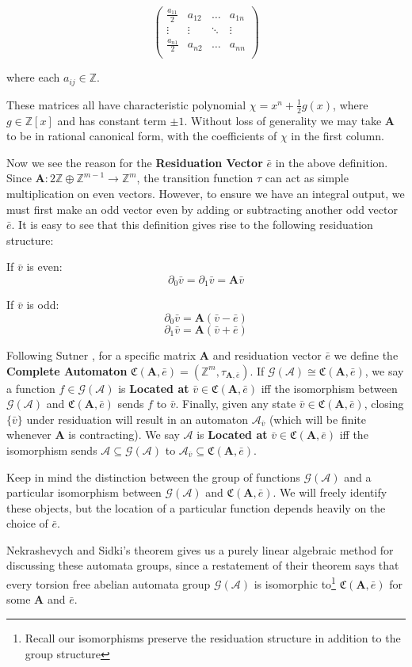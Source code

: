 \documentclass[final]{ws-ijac}
\newcommand{\A}{\mathcal{A}}
\newcommand{\G}{\mathcal{G}}
\newcommand{\C}{\mathfrak{C}(\Am,\e)}
\newcommand{\Z}{\mathbb{Z}}
\newcommand{\2}{\textbf{2}}
\newcommand{\Am}{\textbf{A}}
\newcommand{\del}{\partial}
\newcommand{\vv}{\bar{v}}
\newcommand{\e}{\bar{e}}
\begin{document}
\[
\begin{pmatrix}
  \frac{a_{11}}{2} & a_{12} & \dots  & a_{1n}\\
  \vdots           & \vdots & \ddots & \vdots\\
  \frac{a_{n1}}{2} & a_{n2} & \dots  & a_{nn}\\
\end{pmatrix}
\]

\noindent
where each $a_{ij} \in \Z$. 

These matrices all have characteristic polynomial
$\chi = x^n + \frac{1}{2}g(x)$, where $g \in \Z[x]$ and has constant term 
$\pm 1$. Without loss of generality we may take $\Am$ to be in rational 
canonical form, with the coefficients of $\chi$ in the first column.

Now we see the reason for the \textbf{Residuation Vector} $\e$ in the 
above definition. Since $\Am : 2\Z \oplus \Z^{m-1} \to \Z^m$, the transition
function $\tau$ can act as simple multiplication on even vectors. However,
to ensure we have an integral output, we must first make an odd vector 
even by adding or subtracting another odd vector $\e$. It is easy to see 
that this definition gives rise to the following residuation structure:

If $\vv$ is even:
\[ \del_0 \vv = \del_1 \vv = \Am \vv \]

If $\vv$ is odd:
\[ \del_0 \vv = \Am (\vv - \e) \]
\[ \del_1 \vv = \Am (\vv + \e) \]

\noindent
Following Sutner \cite{Sutner18:abelian_automata}, for a specific matrix
$\Am$ and residuation vector $\e$ we define the \textbf{Complete Automaton} 
$\C = (\Z^m, \tau_{\Am,\e})$. If $\G(\A) \cong \C$, we say a 
function $f \in \G(\A)$ is \textbf{Located at} $\vv \in \C$ iff the isomorphism 
between $\G(\A)$ and $\C$ sends $f$ to $\vv$. Finally, given any 
state $\vv \in \C$, closing $\{ \vv \}$ under residuation will result in an
automaton $\A_{\vv}$ (which will be finite whenever $\Am$ is contracting). 
We say $\A$ is \textbf{Located at} $\vv \in \C$ iff the isomorphism sends 
$\A \subseteq \G(\A)$ to $\A_{\vv} \subseteq \C$. 

Keep in mind the distinction between the group of functions $\G(\A)$
and a particular isomorphism between $\G(\A)$ and $\C$. We will freely
identify these objects, but the location of a particular function
depends heavily on the choice of $\e$.

Nekrashevych and Sidki's theorem gives us a purely linear algebraic method
for discussing these automata groups, since a restatement of their theorem 
says that every torsion free abelian automata group $\G(\A)$ is isomorphic 
to\footnote{Recall our isomorphisms preserve the residuation structure in addition to the group structure} 
$\C$ for some $\Am$ and $\e$. 
\end{document}
